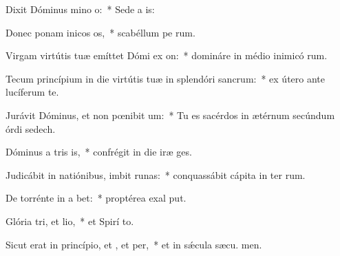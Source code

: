 \item Dixit Dóminus mino o:~* Sede a  is:
\item Donec ponam inicos os,~* scabéllum pe rum.
\item Virgam virtútis tuæ emíttet Dómi ex on:~* domináre in médio inimicó rum.
\item Tecum princípium in die virtútis tuæ in splendóri sancrum:~* ex útero ante lucíferum  te.
\item Jurávit Dóminus, et non pœnibit um:~* Tu es sacérdos in ætérnum secúndum órdi sedech.
\item Dóminus a tris is,~* confrégit in die iræ  ges.
\item Judicábit in natiónibus, imbit runas:~* conquassábit cápita in ter rum.
\item De torrénte in a bet:~* proptérea exal put.
\item Glória tri, et lio,~* et Spirí to.
\item Sicut erat in princípio, et , et per,~* et in sǽcula sæcu. men.
